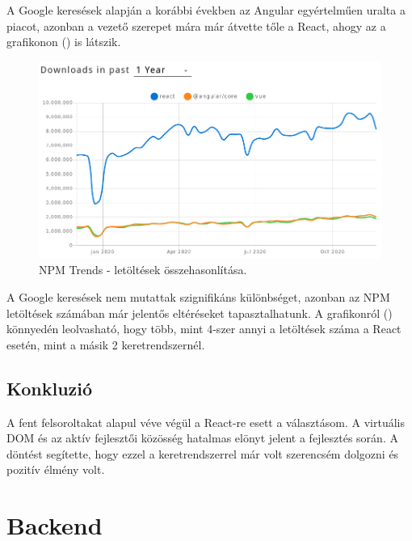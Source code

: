 A Google keresések alapján a korábbi években az Angular egyértelműen uralta a piacot, azonban a vezető szerepet mára már átvette tőle a React, ahogy az a grafikonon () is látszik.

\begin{figure}[!ht]
  \centering
  \includegraphics[width=150mm, keepaspectratio]{figures/npm_trends.png}
  \caption{NPM Trends - letöltések összehasonlítása.}
  \label{fig:NPMTrends}
\end{figure}

A Google keresések nem mutattak szignifikáns különbséget, azonban az NPM letöltések számában már jelentős eltéréseket tapasztalhatunk. A grafikonról () könnyedén leolvasható, hogy több, mint 4-szer annyi a letöltések száma a React esetén, mint a másik 2 keretrendszernél.

\subsection{Konkluzió}
A fent felsoroltakat alapul véve végül a React-re esett a választásom. A virtuális DOM és az aktív fejlesztői közösség hatalmas elönyt jelent a fejlesztés során. A döntést segítette, hogy ezzel a keretrendszerrel már volt szerencsém dolgozni és pozitív élmény volt.

\section{Backend}

